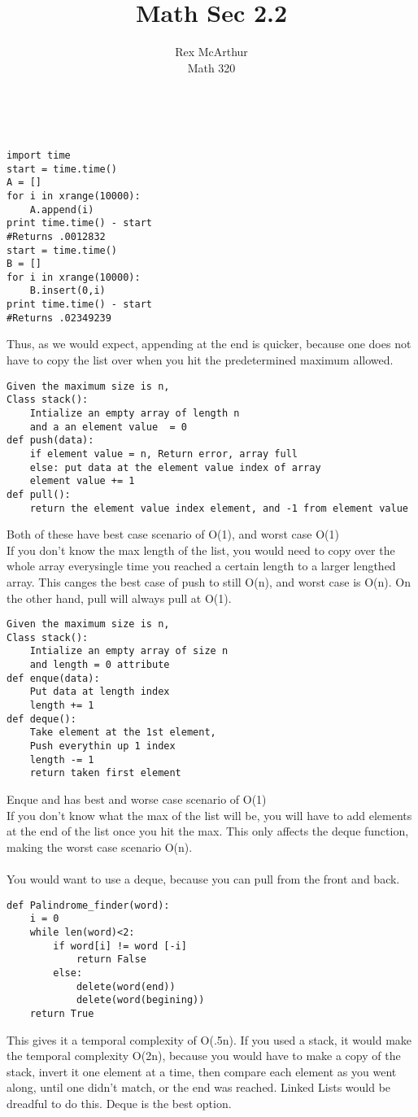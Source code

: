 \documentclass[letterpaper,12pt]{article}
\title{Math Sec 2.2}
\author{Rex McArthur\\Math 320}
\theoremstyle{definition}
\begin{document}
\maketitle
{}\\
\begin{lstlisting}
import time
start = time.time()
A = []
for i in xrange(10000):
    A.append(i)
print time.time() - start
#Returns .0012832
start = time.time()
B = []
for i in xrange(10000):
    B.insert(0,i)
print time.time() - start
#Returns .02349239 
\end{lstlisting}
Thus, as we would expect, appending at the end is quicker, because one does not have to copy the list
over when you hit the predetermined maximum allowed.
\begin{lstlisting}
Given the maximum size is n,
Class stack():
    Intialize an empty array of length n
    and a an element value  = 0
def push(data):
    if element value = n, Return error, array full
    else: put data at the element value index of array
    element value += 1
def pull():
    return the element value index element, and -1 from element value
\end{lstlisting}
Both of these have best case scenario of O(1), and worst case O(1)\\
If you don't know the max length of the list, you would need to copy over the
whole array everysingle time you reached a certain length to a larger lengthed array.
This canges the best case of push to still O(n), and worst case is 
O(n). On the other hand, pull will always pull at O(1).

\begin{lstlisting}
Given the maximum size is n,
Class stack():
    Intialize an empty array of size n
    and length = 0 attribute
def enque(data):
    Put data at length index
    length += 1
def deque():
    Take element at the 1st element,
    Push everythin up 1 index
    length -= 1
    return taken first element
\end{lstlisting}
Enque and has best and worse case scenario of O(1)\\
If you don't know what the max of the list will be, you will have to add elements at the end of the list
once you hit the max. This only affects the deque function, making the worst case scenario O(n).\\
\\
You would want to use a deque, because you can pull from the front and back.
\begin{lstlisting}
def Palindrome_finder(word):
    i = 0
    while len(word)<2:
        if word[i] != word [-i]
            return False
        else:
            delete(word(end)) 
            delete(word(begining))
    return True
\end{lstlisting}
This gives it a temporal complexity of O(.5n). If you used a stack, it would make the temporal complexity O(2n), because you would have to make a copy of the stack, invert it one element at a time, then compare each element as you went along, until one didn't match, or the end was reached.
Linked Lists would be dreadful to do this. Deque is the best option.
\end{document}
